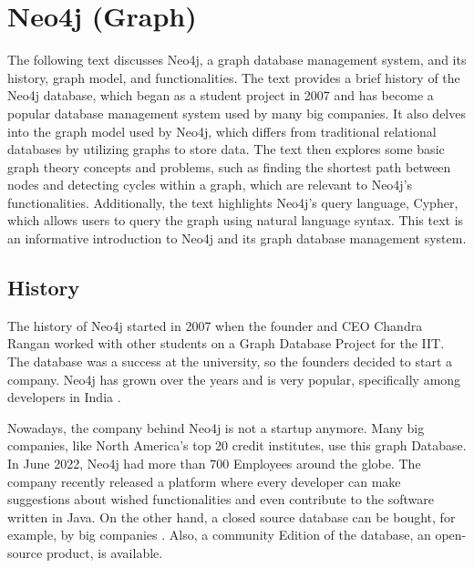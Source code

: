 
\chapter{Neo4j (Graph)} \label{ch:neo4j}

The following text discusses Neo4j, a graph database management system, and its history, graph model, and functionalities. The text provides a brief history of the Neo4j database, which began as a student project in 2007 and has become a popular database management system used by many big companies. It also delves into the graph model used by Neo4j, which differs from traditional relational databases by utilizing graphs to store data. The text then explores some basic graph theory concepts and problems, such as finding the shortest path between nodes and detecting cycles within a graph, which are relevant to Neo4j's functionalities. Additionally, the text highlights Neo4j's query language, Cypher, which allows users to query the graph using natural language syntax. This text is an informative introduction to Neo4j and its graph database management system.

\section{History} \label{sec:historyNeo4j}

The history of Neo4j started in 2007 when the founder and CEO Chandra Rangan worked with other students on a Graph Database Project for the \ac{IIT}. The database was a success at the university, so the founders
decided to start a company. Neo4j has grown over the years and is very popular, specifically among developers in India \parencite{historyneo4j}.

Nowadays, the company behind Neo4j is not a startup anymore. Many big companies, like North America's top 20 credit institutes, use this graph Database. In June 2022, Neo4j had more than 700 Employees around the globe.
The company recently released a platform where every developer can make suggestions about wished functionalities and even contribute
to the software written in Java. On the other hand, a closed source database can be bought, for example, by big companies \parencite{historyneo4j}. Also, a community Edition of the database, an open-source product, is available.

